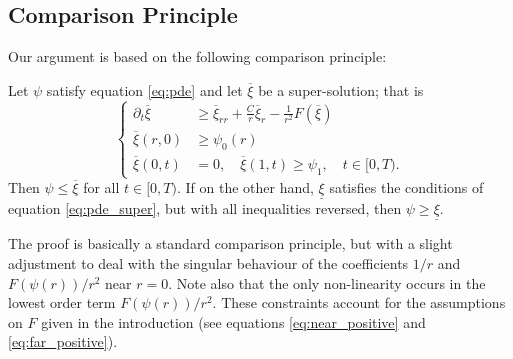 \documentclass{amsart}
\begin{document}
\subsection{Comparison Principle}

Our argument is based on the following comparison principle:

\begin{thm}
\label{thm:comparison}
Let \(\psi\) satisfy equation \eqref{eq:pde} and let \(\overline{\xi}\) be a super-solution; that is
\begin{equation}
\label{eq:pde_super}
\begin{cases}
\partial_t \overline{\xi} &\geq \overline{\xi}_{rr} + \frac{C}{r} \overline{\xi}_r - \frac{1}{r^2} F(\overline{\xi}) \\
\overline{\xi}(r, 0) &\geq \psi_0(r) \\
\overline{\xi}(0, t) &= 0, \quad \overline{\xi}(1, t) \geq \psi_1, \quad t \in [0, T).
\end{cases}
\end{equation}
Then \(\psi \leq \overline{\xi}\) for all \(t \in [0, T)\). If on the other hand, \(\underline{\xi}\) satisfies the conditions of equation \eqref{eq:pde_super}, but with all inequalities reversed, then \(\psi \geq \underline{\xi}\).
\end{thm}

The proof is basically a standard comparison principle, but with a slight adjustment to deal with the singular behaviour of the coefficients \(1/r\) and \(F(\psi(r))/r^2\) near \(r=0\). Note also that the only non-linearity occurs in the lowest order term \(F(\psi(r))/r^2\). These constraints account for the assumptions on \(F\) given in the introduction (see equations \eqref{eq:near_positive} and \eqref{eq:far_positive}).
\end{document}
